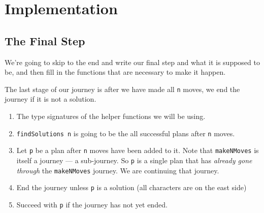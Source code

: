 \documentclass[]{article}
\newenvironment{Shaded}{}{}
\newcommand{\KeywordTok}[1]{\textcolor[rgb]{0.00,0.44,0.13}{\textbf{{#1}}}}
\newcommand{\DataTypeTok}[1]{\textcolor[rgb]{0.56,0.13,0.00}{{#1}}}
\newcommand{\CommentTok}[1]{\textcolor[rgb]{0.38,0.63,0.69}{\textit{{#1}}}}
\newcommand{\OtherTok}[1]{\textcolor[rgb]{0.00,0.44,0.13}{{#1}}}
\newcommand{\FunctionTok}[1]{\textcolor[rgb]{0.02,0.16,0.49}{{#1}}}
\newcommand{\NormalTok}[1]{{#1}}
\begin{document}
\section{Implementation}\label{implementation}

\subsection{The Final Step}\label{the-final-step}

We're going to skip to the end and write our final step and what it is supposed
to be, and then fill in the functions that are necessary to make it happen.

The last stage of our journey is after we have made all \texttt{n} moves, we end
the journey if it is not a solution.

\begin{Shaded}
\end{Shaded}

\begin{enumerate}
\def\labelenumi{\arabic{enumi}.}
\tightlist
\item
  The type signatures of the helper functions we will be using.
\item
  \texttt{findSolutions\ n} is going to be the all successful plans after
  \texttt{n} moves.
\item
  Let \texttt{p} be a plan after \texttt{n} moves have been added to it. Note
  that \texttt{makeNMoves} is itself a journey --- a sub-journey. So \texttt{p}
  is a single plan that has \emph{already gone through} the \texttt{makeNMoves}
  journey. We are continuing that journey.
\item
  End the journey unless \texttt{p} is a solution (all characters are on the
  east side)
\item
  Succeed with \texttt{p} if the journey has not yet ended.
\end{enumerate}
\end{document}
